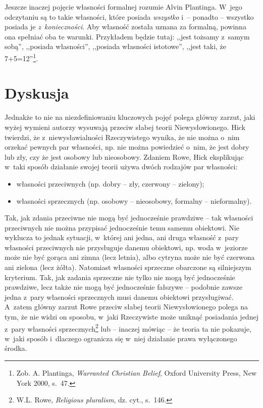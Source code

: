 Jeszcze inaczej pojęcie własności formalnej rozumie Alvin Plantinga. W~jego odczytaniu są to takie własności, które posiada \textit{wszystko} i~-- ponadto -- wszystko posiada je \textit{z~konieczności}. Aby własność została uznana za formalną, powinna ona spełniać oba te warunki. Przykładem będzie tutaj: ,,jest tożsamy z~samym sobą'', ,,posiada własności'', ,,posiada własności istotowe'', ,,jest taki, że 7+5=12''\footnote{Zob. A. Plantinga, \textit{Warranted Christian Belief}, Oxford University Press, New York 2000, s.~47.}.


\section{Dyskusja}

Jednakże to nie na niezdefiniowaniu kluczowych pojęć polega główny zarzut, jaki wyżej wymieni autorzy wysuwają przeciw słabej teorii Niewysłowionego. Hick twierdzi, że z~niewysławialności Rzeczywistego wynika, że nie można o~nim orzekać pewnych par własności, np. nie można powiedzieć o~nim, że jest dobry lub zły, czy że jest osobowy lub nieosobowy. Zdaniem Rowe, Hick eksplikując w~taki sposób działanie swojej teorii używa dwóch rodzajów par własności:

\begin{itemize}
\item własności przeciwnych (np. dobry -- zły, czerwony -- zielony);
\item własności sprzecznych (np. osobowy -- nieosobowy, formalny -- nieformalny).
\end{itemize}
Tak, jak zdania przeciwne nie mogą być jednocześnie prawdziwe -- tak własności przeciwnych nie można przypisać jednocześnie temu samemu obiektowi. Nie wyklucza to jednak sytuacji, w~której ani jedna, ani druga własność z~pary własności przeciwnych nie przysługuje danemu obiektowi, np. woda w~jeziorze może nie być gorąca ani zimna (lecz letnia), albo cytryna może nie być czerwona ani zielona (lecz żółta). Natomiast własności sprzeczne obarczone są silniejszym kryterium. Tak, jak zadania sprzeczne nie tylko nie mogą być jednocześnie prawdziwe, lecz także nie mogą być jednocześnie fałszywe -- podobnie zawsze jedna z~pary własności sprzecznych musi danemu obiektowi przysługiwać. A~zatem główny zarzut Rowe przeciw słabej teorii Niewysłowionego polega na tym, że nie widzi on sposobu, w~jaki Rzeczywiste może uniknąć posiadania jednej z~pary własności sprzecznych\footnote{W.L. Rowe, \textit{Religious pluralism}, dz. cyt., s.~146.} lub -- inaczej mówiąc -- że teoria ta nie pokazuje, w~jaki sposób i~dlaczego ogranicza się w~niej działanie prawa wyłączonego środka.


